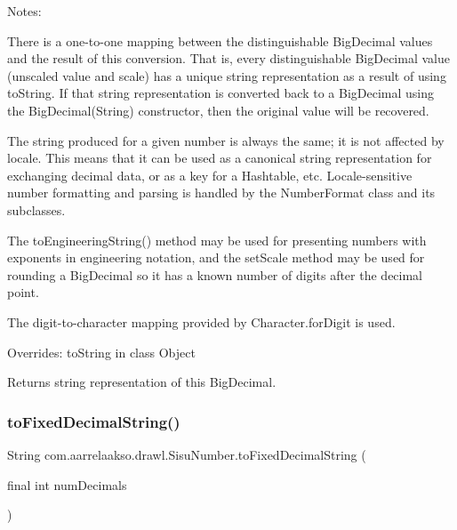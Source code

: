 Notes\+: 

There is a one-\/to-\/one mapping between the distinguishable Big\+Decimal values and the result of this conversion. That is, every distinguishable Big\+Decimal value (unscaled value and scale) has a unique string representation as a result of using to\+String. If that string representation is converted back to a Big\+Decimal using the Big\+Decimal(\+String) constructor, then the original value will be recovered. 

The string produced for a given number is always the same; it is not affected by locale. This means that it can be used as a canonical string representation for exchanging decimal data, or as a key for a Hashtable, etc. Locale-\/sensitive number formatting and parsing is handled by the Number\+Format class and its subclasses. 

The to\+Engineering\+String() method may be used for presenting numbers with exponents in engineering notation, and the set\+Scale method may be used for rounding a Big\+Decimal so it has a known number of digits after the decimal point. 

The digit-\/to-\/character mapping provided by Character.\+for\+Digit is used. 

Overrides\+: to\+String in class Object

\begin{DoxyReturn}{Returns}
string representation of this Big\+Decimal. 
\end{DoxyReturn}
\mbox{\label{classcom_1_1aarrelaakso_1_1drawl_1_1_sisu_number_a487c37a577a8b4a52e86832a32bc303d}} 
\subsubsection{\texorpdfstring{to\+Fixed\+Decimal\+String()}{toFixedDecimalString()}}
{\footnotesize\ttfamily String com.\+aarrelaakso.\+drawl.\+Sisu\+Number.\+to\+Fixed\+Decimal\+String (\begin{DoxyParamCaption}\item[{final int}]{num\+Decimals }\end{DoxyParamCaption})\hspace{0.3cm}{\ttfamily [protected]}}



